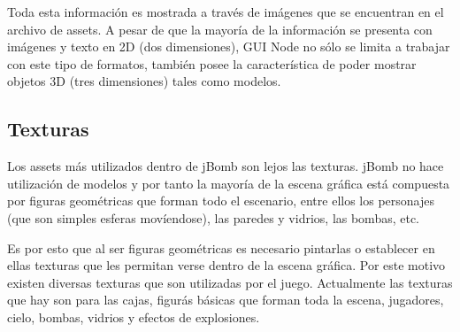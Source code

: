 \documentclass[a4paper,12pt,openany,oneside]{book}
\begin{document}
Toda esta información es mostrada a través de imágenes que se encuentran en el archivo de assets. A pesar de que la mayoría de la información se presenta con imágenes y texto en 2D (dos dimensiones), GUI Node no sólo se limita a trabajar con este tipo de formatos, también posee la característica de poder mostrar objetos 3D (tres dimensiones) tales como modelos.
\subsection{Texturas}
Los assets más utilizados dentro de jBomb son lejos las texturas. jBomb no hace utilización de modelos y por tanto la mayoría de la escena gráfica está compuesta por figuras geométricas que forman todo el escenario, entre ellos los personajes (que son simples esferas movíendose), las paredes y vidrios, las bombas, etc.

Es por esto que al ser figuras geométricas es necesario pintarlas o establecer en ellas texturas que les permitan verse dentro de la escena gráfica. Por este motivo existen diversas texturas que son utilizadas por el juego. Actualmente las texturas que hay son para las cajas, figurás básicas que forman toda la escena, jugadores, cielo, bombas, vidrios y efectos de explosiones.
\end{document}
